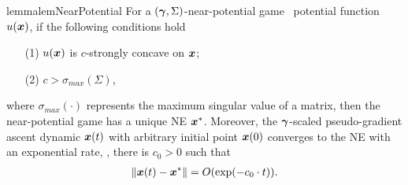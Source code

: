 \begin{restatable}{lemma}{lemNearPotential}
\label{lem:near-potential}
For a $(\bm{\gamma},\Sigma)$-near-potential game  \wrt ~potential function $u({\bm{x}})$, if the following conditions hold
\begin{itemize}
    \item[(1)] $u({\bm{x}})$ is $c$-strongly concave on ${\bm{x}}$;
    \item[(2)] $c > \sigma_{max}(\Sigma)$,
\end{itemize}
where $\sigma_{max}(\cdot)$ represents the maximum singular value of a matrix,
then the near-potential game has a unique NE ${\bm{x}}^*$.
Moreover, the $\bm{\gamma}$-scaled pseudo-gradient ascent dynamic ${\bm{x}}(t)$ with arbitrary initial point ${\bm{x}}(0)$ converges to the NE with an exponential rate, \ie, there is $c_0>0$ such that
\begin{align*}
    \| {\bm{x}}(t) - {\bm{x}}^* \| = O(\exp(-c_0\cdot t)).
\end{align*}

\end{restatable}